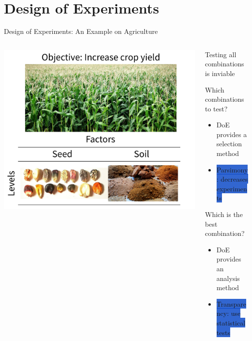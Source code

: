 \documentclass[10pt, compress, aspectratio=169, xcolor={table,usenames,dvipsnames}]{beamer}
\begin{document}
\section{Design of Experiments}
\label{sec:org5e9245a}
\begin{frame}[label={sec:org45ad5bb}]{Design of Experiments: An Example on Agriculture}
\begin{columns}
\begin{column}{0.55\columnwidth}
\begin{center}
\includegraphics[width=.99\columnwidth]{../../../img/crop_yield_doe_example.pdf}
\end{center}
\end{column}
\begin{column}{0.45\columnwidth}
\begin{block}{Testing \alert{all combinations} is \alert{inviable}}
\begin{block}{Which combinations to test?}
\begin{itemize}
\item DoE provides a \alert{selection method}
\item \colorbox{Highlight}{\alert{Parsimony}: decreases experiments}
\end{itemize}
\end{block}

\begin{block}{Which is the best combination?}
\begin{itemize}
\item DoE provides an \alert{analysis method}
\item \colorbox{Highlight}{\alert{Transparency}: use statistical tests}
\end{itemize}
\end{block}
\end{block}
\end{column}
\end{columns}
\end{frame}
\end{document}
